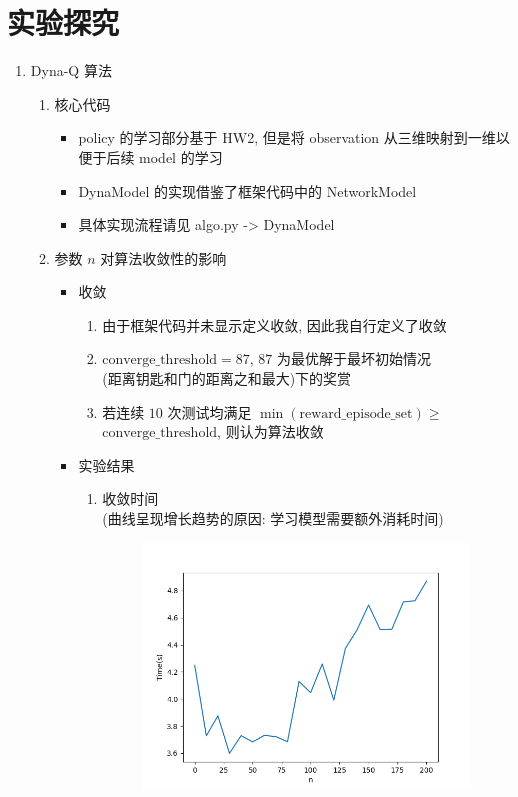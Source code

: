 \documentclass[a4paper,12pt]{article}
\begin{document}
\section{实验探究}
\begin{enumerate}
    \item Dyna-Q 算法
    \begin{enumerate}[(1)]
        \item 核心代码
        \begin{itemize}
            \item policy 的学习部分基于 HW2, 但是将 observation 从三维映射到一维以便于后续 model 的学习
            \item DynaModel 的实现借鉴了框架代码中的 NetworkModel
            \item 具体实现流程请见 algo.py -> DynaModel
        \end{itemize}
        \newpage
        \item 参数 $n$ 对算法收敛性的影响
        \begin{itemize}
            \item 收敛 
            \begin{enumerate}
                \item 由于框架代码并未显示定义收敛, 因此我自行定义了收敛
                \item $\text{converge\_threshold}=87$, $87$ 为最优解于最坏初始情况\\
                (距离钥匙和门的距离之和最大)下的奖赏
                \item 若连续 $10$ 次测试均满足 $\min(\text{reward\_episode\_set})\geq$\\
                $\text{converge\_threshold}$, 则认为算法收敛
            \end{enumerate}
            \item 实验结果
            \begin{enumerate}
                \item 收敛时间 \\
                (曲线呈现增长趋势的原因: 学习模型需要额外消耗时间)
                \begin{figure}[h!]
                    \centering
                    \includegraphics[scale=0.45]{pics/1-time.png}

\end{figure}
\end{enumerate}
\end{itemize}
\end{enumerate}
\end{enumerate}
\end{document}
